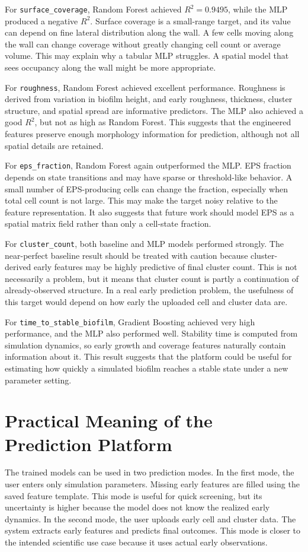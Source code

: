 \documentclass[12pt,a4paper,oneside]{report}
\begin{document}
For \texttt{surface\_coverage}, Random Forest achieved \(R^2=0.9495\), while the MLP produced a negative \(R^2\). Surface coverage is a small-range target, and its value can depend on fine lateral distribution along the wall. A few cells moving along the wall can change coverage without greatly changing cell count or average volume. This may explain why a tabular MLP struggles. A spatial model that sees occupancy along the wall might be more appropriate.

For \texttt{roughness}, Random Forest achieved excellent performance. Roughness is derived from variation in biofilm height, and early roughness, thickness, cluster structure, and spatial spread are informative predictors. The MLP also achieved a good \(R^2\), but not as high as Random Forest. This suggests that the engineered features preserve enough morphology information for prediction, although not all spatial details are retained.

For \texttt{eps\_fraction}, Random Forest again outperformed the MLP. EPS fraction depends on state transitions and may have sparse or threshold-like behavior. A small number of EPS-producing cells can change the fraction, especially when total cell count is not large. This may make the target noisy relative to the feature representation. It also suggests that future work should model EPS as a spatial matrix field rather than only a cell-state fraction.

For \texttt{cluster\_count}, both baseline and MLP models performed strongly. The near-perfect baseline result should be treated with caution because cluster-derived early features may be highly predictive of final cluster count. This is not necessarily a problem, but it means that cluster count is partly a continuation of already-observed structure. In a real early prediction problem, the usefulness of this target would depend on how early the uploaded cell and cluster data are.

For \texttt{time\_to\_stable\_biofilm}, Gradient Boosting achieved very high performance, and the MLP also performed well. Stability time is computed from simulation dynamics, so early growth and coverage features naturally contain information about it. This result suggests that the platform could be useful for estimating how quickly a simulated biofilm reaches a stable state under a new parameter setting.

\section{Practical Meaning of the Prediction Platform}
The trained models can be used in two prediction modes. In the first mode, the user enters only simulation parameters. Missing early features are filled using the saved feature template. This mode is useful for quick screening, but its uncertainty is higher because the model does not know the realized early dynamics. In the second mode, the user uploads early cell and cluster data. The system extracts early features and predicts final outcomes. This mode is closer to the intended scientific use case because it uses actual early observations.
\end{document}
